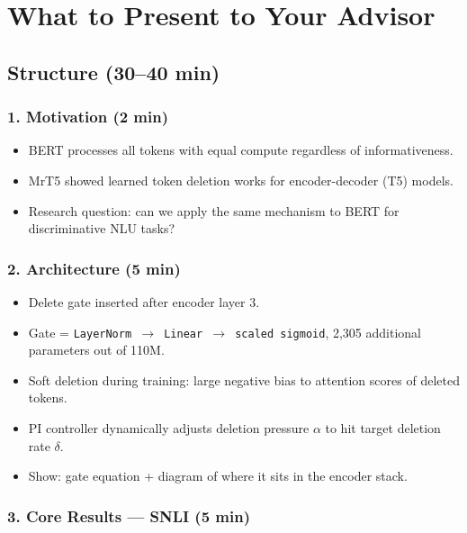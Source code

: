 \documentclass[11pt,a4paper]{article}
\begin{document}
\section{What to Present to Your Advisor}
\label{sec:presentation}

\subsection*{Structure (30--40 min)}

\subsubsection*{1. Motivation (2 min)}

\begin{itemize}[nosep]
    \item BERT processes all tokens with equal compute regardless of informativeness.
    \item MrT5 showed learned token deletion works for encoder-decoder (T5) models.
    \item Research question: can we apply the same mechanism to BERT for discriminative NLU tasks?
\end{itemize}

\subsubsection*{2. Architecture (5 min)}

\begin{itemize}[nosep]
    \item Delete gate inserted after encoder layer 3.
    \item Gate = \texttt{LayerNorm $\rightarrow$ Linear $\rightarrow$ scaled sigmoid}, 2,305 additional parameters out of 110M.
    \item Soft deletion during training: large negative bias to attention scores of deleted tokens.
    \item PI controller dynamically adjusts deletion pressure $\alpha$ to hit target deletion rate $\delta$.
    \item Show: gate equation + diagram of where it sits in the encoder stack.
\end{itemize}

\subsubsection*{3. Core Results --- SNLI (5 min)}
\end{document}
